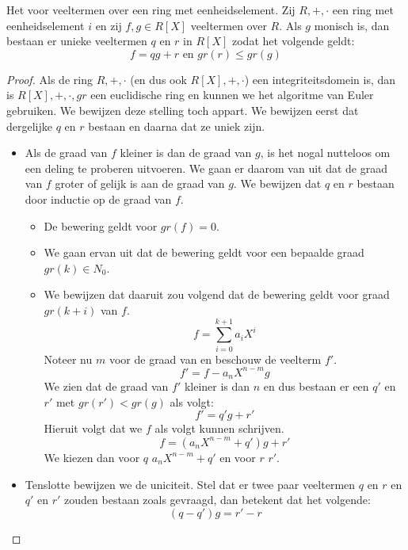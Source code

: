 \documentclass[main.tex]{subfiles}
\begin{document}
\begin{st}
  \label{st:delingsalgoritme}
  Het  voor veeltermen over een ring met eenheidselement.
  Zij $R,+,\cdot$ een ring met eenheidselement $i$ en zij $f,g\in R[X]$ veeltermen over $R$.
  Als $g$ monisch is, dan bestaan er unieke veeltermen $q$ en $r$ in $R[X]$ zodat het volgende geldt:
  \[ f = qg + r \text{ en } gr(r) \le gr(g) \]

  \begin{proof}
    Als de ring $R,+,\cdot$ (en dus ook $R[X],+,\cdot$) een integriteitsdomein is, dan is $R[X],+,\cdot,gr$ een euclidische ring en kunnen we het algoritme van Euler gebruiken.
    We bewijzen deze stelling toch appart.
    We bewijzen eerst dat dergelijke $q$ en $r$ bestaan en daarna dat ze uniek zijn.
    \begin{itemize}
    \item Als de graad van $f$ kleiner is dan de graad van $g$, is het nogal nutteloos om een deling te proberen uitvoeren.
      We gaan er daarom van uit dat de graad van $f$ groter of gelijk is aan de graad van $g$.
      We bewijzen dat $q$ en $r$ bestaan door inductie op de graad van $f$.
      \begin{itemize}
      \item De bewering geldt voor $gr(f)=0$.
      \item We gaan ervan uit dat de bewering geldt voor een bepaalde graad $gr(k) \in N_{0}$.
      \item We bewijzen dat daaruit zou volgend dat de bewering geldt voor graad $gr(k+i)$ van $f$.
        \[ f = \sum_{i=0}^{k+1}a_{i}X^{i} \]
        Noteer nu $m$ voor de graad van en beschouw de veelterm $f'$.
        \[ f' = f - a_{n}X^{n-m}g \]
        We zien dat de graad van $f'$ kleiner is dan $n$ en dus bestaan er een $q'$ en $r'$ met $gr(r')<gr(g)$ als volgt:
        \[ f' = q'g+r' \]
        Hieruit volgt dat we $f$ als volgt kunnen schrijven.
        \[ f = (a_{n}X^{n-m} + q')g + r' \]
        We kiezen dan voor $q$ $a_{n}X^{n-m} + q'$ en voor $r$ $r'$.
      \end{itemize}
    \item Tenslotte bewijzen we de uniciteit.
      Stel dat er twee paar veeltermen $q$ en $r$ en $q'$ en $r'$ zouden bestaan zoals gevraagd, dan betekent dat het volgende:
      \[ (q-q')g = r' - r \]
    \end{itemize}
  \end{proof}
\end{st}
\end{document}
